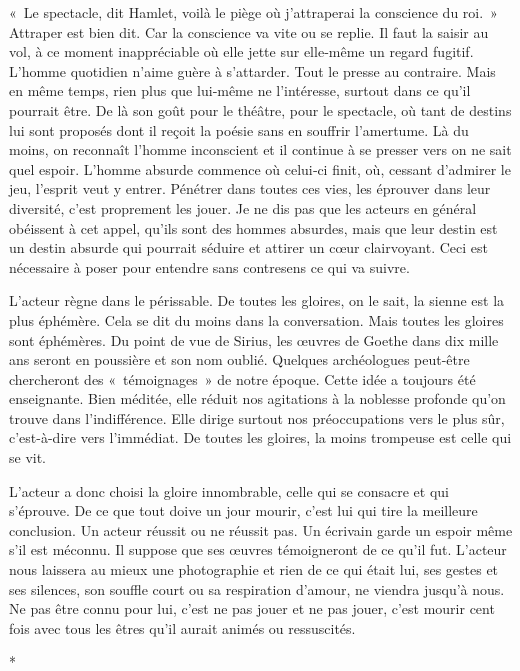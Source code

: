 \documentclass{book}
\begin{document}
« Le spectacle, dit Hamlet, voilà le piège où j'attraperai la conscience du roi. » Attraper est bien dit. Car la conscience va vite ou se replie. Il faut la saisir au vol, à ce moment inappréciable où elle jette sur elle‑même un regard fugitif. L'homme quotidien n'aime guère à s'attarder. Tout le presse au contraire. Mais en même temps, rien plus que lui‑même ne l'intéresse, surtout dans ce qu'il pourrait être. De là son goût pour le théâtre, pour le spectacle, où tant de destins lui sont proposés dont il reçoit la poésie sans en souffrir l'amertume. Là du moins, on reconnaît l'homme inconscient et il continue à se presser vers on ne sait quel espoir. L'homme absurde commence où celui‑ci finit, où, cessant d'admirer le jeu, l'esprit veut y entrer. Pénétrer dans toutes ces vies, les éprouver dans leur diversité, c'est proprement les jouer. Je ne dis pas que les acteurs en général obéissent à cet appel, qu'ils sont des hommes absurdes, mais que leur destin est un destin absurde qui pourrait séduire et attirer un cœur clairvoyant. Ceci est nécessaire à poser pour entendre sans contresens ce qui va suivre.

L'acteur règne dans le périssable. De toutes les gloires, on le sait, la sienne est la plus éphémère. Cela se dit du moins dans la conversation. Mais toutes les gloires sont éphémères. Du point de vue de Sirius, les œuvres de Goethe dans dix mille ans seront en poussière et son nom oublié. Quelques archéologues peut-être chercheront des « témoignages » de notre époque. Cette idée a toujours été enseignante. Bien méditée, elle réduit nos agitations à la noblesse profonde qu'on trouve dans l'indifférence. Elle dirige surtout nos préoccupations vers le plus sûr, c'est-à-dire vers l'immédiat. De toutes les gloires, la moins trompeuse est celle qui se vit.

L'acteur a donc choisi la gloire innombrable, celle qui se consacre et qui s'éprouve. De ce que tout doive un jour mourir, c'est lui qui tire la meilleure conclusion. Un acteur réussit ou ne réussit pas. Un écrivain garde un espoir même s'il est méconnu. Il suppose que ses œuvres témoigneront de ce qu'il fut. L'acteur nous laissera au mieux une photographie et rien de ce qui était lui, ses gestes et ses silences, son souffle court ou sa respiration d'amour, ne viendra jusqu'à nous. Ne pas être connu pour lui, c'est ne pas jouer et ne pas jouer, c'est mourir cent fois avec tous les êtres qu'il aurait animés ou ressuscités.

\begin{center}
*
\end{center}
\end{document}
